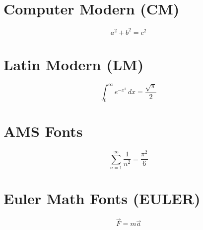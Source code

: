\documentclass{article}
\begin{document}
\section*{Computer Modern (CM)}
\lipsum[1]
\[ a^2 + b^2 = c^2 \]
\lipsum[2]

\section*{Latin Modern (LM)}
\lipsum[3]
\[ \int_{0}^{\infty} e^{-x^2} \, dx = \frac{\sqrt{\pi}}{2} \]
\lipsum[4]

\section*{AMS Fonts}
\lipsum[5]
\[ \sum_{n=1}^{\infty} \frac{1}{n^2} = \frac{\pi^2}{6} \]
\lipsum[6]

\section*{Euler Math Fonts (EULER)}
\lipsum[7]
\[ \vec{F} = m\vec{a} \]
\lipsum[8]
\end{document}
